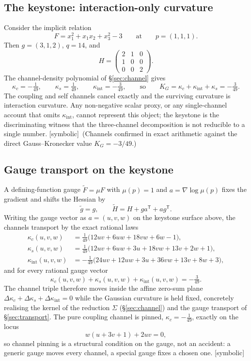 \documentclass[11pt]{article}
\newcommand{\Symbolic}{\textsf{[symbolic]}}
\theoremstyle{plain}
\theoremstyle{definition}
\newcommand{\KG}{K_{G}}
\newcommand{\kc}{\kappa_{c}}
\newcommand{\kint}{\kappa_{\mathrm{int}}}
\newcommand{\ks}{\kappa_{s}}
\begin{document}
\subsection{The keystone: interaction-only curvature}
Consider the implicit relation
\[
F=x_1^2+x_1x_2+x_3^2-3\qquad\text{at}\qquad p=(1,1,1).
\]
Then $g=(3,1,2)$, $q=14$, and
\[
H=\begin{pmatrix}2&1&0\\1&0&0\\0&0&2\end{pmatrix}.
\]
The channel-density polynomial of \S\ref{sec:channel} gives
\[
\kc=-\tfrac1{49},\qquad \ks=\tfrac1{49},\qquad \kint=-\tfrac3{49},
\qquad\text{so}\qquad \KG=\kc+\kint+\ks=-\tfrac3{49}.
\]
The coupling and self channels cancel exactly and the surviving curvature is interaction curvature.
Any non-negative scalar proxy, or any single-channel account that omits $\kint$, cannot represent this
object; the keystone is the discriminating witness that the three-channel decomposition is not
reducible to a single number. \Symbolic\ (Channels confirmed in exact arithmetic against the direct
Gauss--Kronecker value $\KG=-3/49$.)

\subsection{Gauge transport on the keystone}
A defining-function gauge $\widetilde F=\mu F$ with $\mu(p)=1$ and $a=\nabla\log\mu(p)$ fixes the
gradient and shifts the Hessian by
\[
\widetilde g=g,\qquad \widetilde H=H+ga^{\mathsf T}+ag^{\mathsf T}.
\]
Writing the gauge vector as $a=(u,v,w)$ on the keystone surface above, the channels transport by the
exact rational laws
\begin{align*}
\kc(u,v,w)&=\tfrac1{49}\bigl(12uv+6uw+18vw+6w-1\bigr),\\
\ks(u,v,w)&=\tfrac1{49}\bigl(12uv+6uw+3u+18vw+13v+2w+1\bigr),\\
\kint(u,v,w)&=-\tfrac1{49}\bigl(24uv+12uw+3u+36vw+13v+8w+3\bigr),
\end{align*}
and for every rational gauge vector
\[
\kc(u,v,w)+\ks(u,v,w)+\kint(u,v,w)=-\tfrac3{49}.
\]
The channel triple therefore moves inside the affine zero-sum plane
$\Delta\kc+\Delta\ks+\Delta\kint=0$ while the Gaussian curvature is held fixed, concretely realising
the kernel of the reduction $\Sigma$ (\S\ref{sec:channel}) and the gauge transport of
\S\ref{sec:transport}. The pure coupling channel is pinned, $\kc=-\tfrac1{49}$, exactly on the locus
\[
w(u+3v+1)+2uv=0,
\]
so channel pinning is a structural condition on the gauge, not an accident: a generic gauge moves
every channel, a special gauge fixes a chosen one. \Symbolic
\end{document}
